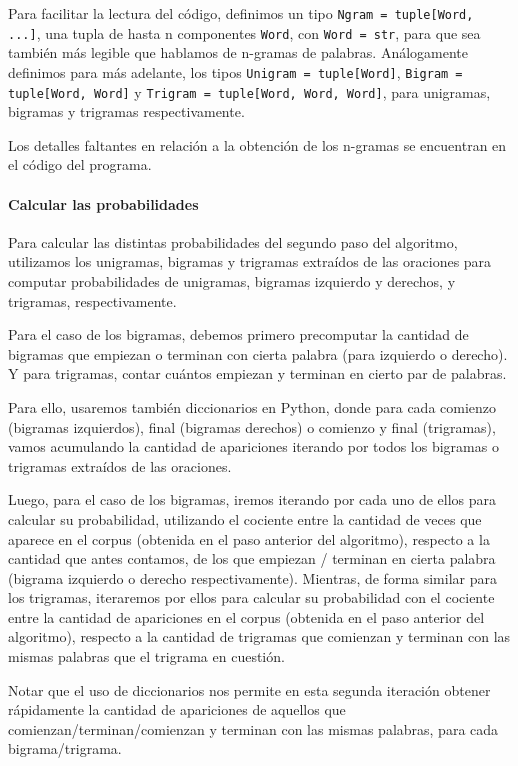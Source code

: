 \documentclass[a4paper]{article}
\begin{document}
Para facilitar la lectura del código, definimos un tipo \texttt{Ngram = tuple[Word, ...]}, una tupla de hasta n componentes \texttt{Word}, con \texttt{Word = str}, para que sea también más legible que hablamos de n-gramas de palabras. Análogamente definimos para más adelante, los tipos \texttt{Unigram = tuple[Word]}, \texttt{Bigram = tuple[Word, Word]} y \texttt{Trigram = tuple[Word, Word, Word]}, para unigramas, bigramas y trigramas respectivamente.

Los detalles faltantes en relación a la obtención de los n-gramas se encuentran en el código del programa.

\paragraph{Calcular las probabilidades}

Para calcular las distintas probabilidades del segundo paso del algoritmo, utilizamos los unigramas, bigramas y trigramas extraídos de las oraciones para computar probabilidades de unigramas, bigramas izquierdo y derechos, y trigramas, respectivamente.

Para el caso de los bigramas, debemos primero precomputar la cantidad de bigramas que empiezan o terminan con cierta palabra (para izquierdo o derecho). Y para trigramas, contar cuántos empiezan y terminan en cierto par de palabras.

Para ello, usaremos también diccionarios en Python, donde para cada comienzo (bigramas izquierdos), final (bigramas derechos) o comienzo y final (trigramas), vamos acumulando la cantidad de apariciones iterando por todos los bigramas o trigramas extraídos de las oraciones.

Luego, para el caso de los bigramas, iremos iterando por cada uno de ellos para calcular su probabilidad, utilizando el cociente entre la cantidad de veces que aparece en el corpus (obtenida en el paso anterior del algoritmo), respecto a la cantidad que antes contamos, de los que empiezan / terminan en cierta palabra (bigrama izquierdo o derecho respectivamente). Mientras, de forma similar para los trigramas, iteraremos por ellos para calcular su probabilidad con el cociente entre la cantidad de apariciones en el corpus (obtenida en el paso anterior del algoritmo), respecto a la cantidad de trigramas que comienzan y terminan con las mismas palabras que el trigrama en cuestión.

Notar que el uso de diccionarios nos permite en esta segunda iteración obtener rápidamente la cantidad de apariciones de aquellos que comienzan/terminan/comienzan y terminan con las mismas palabras, para cada bigrama/trigrama.
\end{document}
